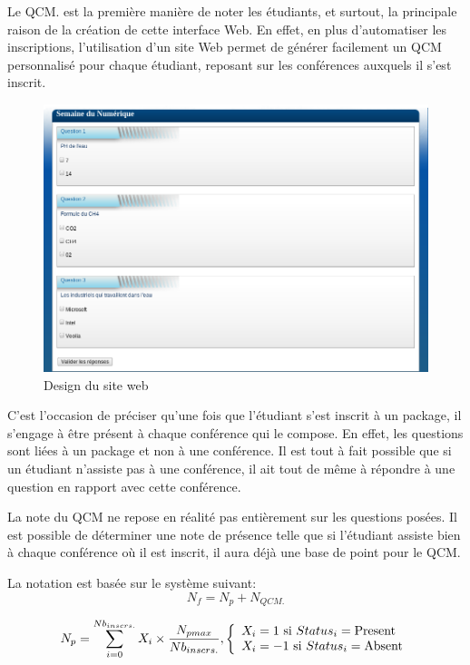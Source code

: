 Le QCM. est la première manière de noter les étudiants, et surtout, la principale
raison de la création de cette interface Web. En effet, en plus d'automatiser les
inscriptions, l'utilisation d'un site Web permet de générer facilement un QCM
personnalisé pour chaque étudiant, reposant sur les conférences auxquels il s'est inscrit.

    \begin{figure}[h]
        \begin{center}
        \includegraphics[scale=0.4]{images/screenshotQCM.png} 
        \end{center}
        \caption{Design du site web}
        \label{Design du site web}
    \end{figure}

C'est l'occasion de préciser qu'une fois que l'étudiant s'est inscrit à un package,
il s'engage à être présent à chaque conférence qui le compose. En effet, les
questions sont liées à un package et non à une conférence.
Il est tout à fait possible que si un étudiant n'assiste pas à une conférence,
il ait tout de même à répondre à une question en rapport avec cette conférence.

La note du QCM ne repose en réalité pas entièrement sur les questions posées.
Il est possible de déterminer une note de présence telle que si l'étudiant assiste
bien à chaque conférence où il est inscrit, il aura déjà une base de point pour le QCM.

La notation est basée sur le système suivant:
\begin{equation}N_{f} = N_{p} + N_{QCM.}\end{equation}

\begin{equation}
    N_{p} = \sum_{i = 0}^{Nb_{inscrs.}} X_{i} \times \frac{N_{pmax}}{Nb_{inscrs.}} {,}
    \left\{
    \begin{array}{l l}
        X_{i} = 1 \text{ si }Status_{i} = \text{Present}\\
        X_{i} = -1\text{ si }Status_{i} = \text{Absent}\\
    \end{array}
    \right.
\end{equation}

